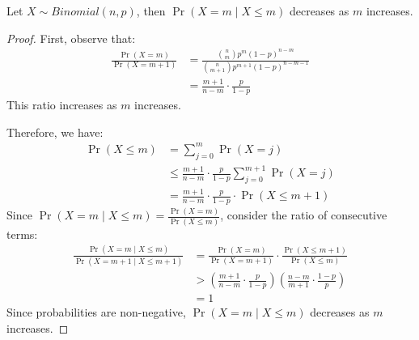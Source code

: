\begin{lemma}\label{lem:binomDesc}
    Let $X \sim Binomial(n,p)$, then $\Pr(X = m \mid X \leq m)$ decreases as \(m\) increases.  
\end{lemma}
\begin{proof}
    First, observe that:
    \begin{align*}
    \frac{\Pr(X = m)}{\Pr(X = m+1)} & = \frac{\binom{n}{m} p^{m} (1-p)^{n-m}}{\binom{n}{m+1} p^{m+1} (1-p)^{n-m-1}} \\
                                & = \frac{m+1}{n-m} \cdot \frac{p}{1-p}
    \end{align*}
    This ratio increases as \(m\) increases.

    Therefore, we have:
    \begin{align*}
        \Pr(X \leq m) & = \sum_{j=0}^{m} \Pr(X = j) \\
                    & \leq \frac{m+1}{n-m} \cdot \frac{p}{1-p} \sum_{j=0}^{m+1} \Pr(X = j) \\
                    & = \frac{m+1}{n-m} \cdot \frac{p}{1-p} \cdot \Pr(X \leq m+1)
    \end{align*}
    Since \(\Pr(X = m \mid X \leq m) = \frac{\Pr(X = m)}{\Pr(X \leq m)}\), consider the ratio of consecutive terms:
    \begin{align*}
        \frac{\Pr(X = m \mid X \leq m)}{\Pr(X = m+1 \mid X \leq m+1)} & = \frac{\Pr(X = m)}{\Pr(X = m+1)} \cdot \frac{\Pr(X \leq m+1)}{\Pr(X \leq m)} \\
            & > \left( \frac{m+1}{n-m} \cdot \frac{p}{1-p} \right) \left( \frac{n-m}{m+1} \cdot \frac{1-p}{p} \right) \\
            & = 1 
    \end{align*}
    Since probabilities are non-negative, \(\Pr(X = m \mid X \leq m)\) decreases as \(m\) increases.
\end{proof}


